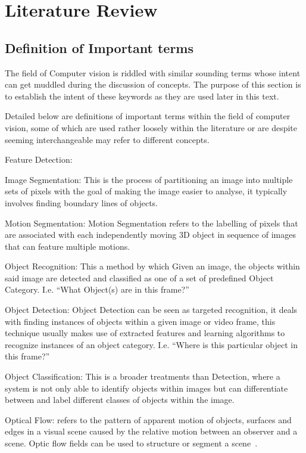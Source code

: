 \chapter{Literature Review}

\section{Definition of Important terms}
The field of Computer vision is riddled with similar sounding terms whose intent
can get muddled during the discussion of concepts.  The purpose of this section
is to establish the intent of these keywords as they are used later in this text.

Detailed below are definitions of important terms within the field of computer
vision, some of which are used rather loosely within the literature or are
despite seeming interchangeable may refer to different concepts. 

Feature Detection:

Image Segmentation: This is the process of partitioning an image into multiple
sets of pixels with the goal of making the image easier to analyse, it typically
involves finding boundary lines of objects. 

Motion Segmentation: Motion Segmentation refers to the labelling of pixels that
are associated with each independently moving 3D object in sequence of images
that can feature multiple motions. \cite{Tekalp2014}

Object Recognition: This a method by which Given an image, the objects within
said image are detected and classified as one of a set of predefined Object
Category.  I.e. “What Object(s) are in this frame?”

Object Detection: Object Detection can be seen as targeted recognition, it deals
with finding instances of objects within a given image or video frame, this
technique usually makes use of extracted features and learning algorithms to
recognize instances of an object category.  I.e. “Where is this particular
object in this frame?”

Object Classification: This is a broader treatments than Detection, where a
system is not only able to identify objects within images but can differentiate
between and label different classes of objects within the image. 

Optical Flow: refers to the pattern of apparent motion of objects, surfaces and
edges in a visual scene caused by the relative motion between an observer and a
scene. Optic flow fields can be used to structure or segment a scene~\cite{Forsyth2012}.

